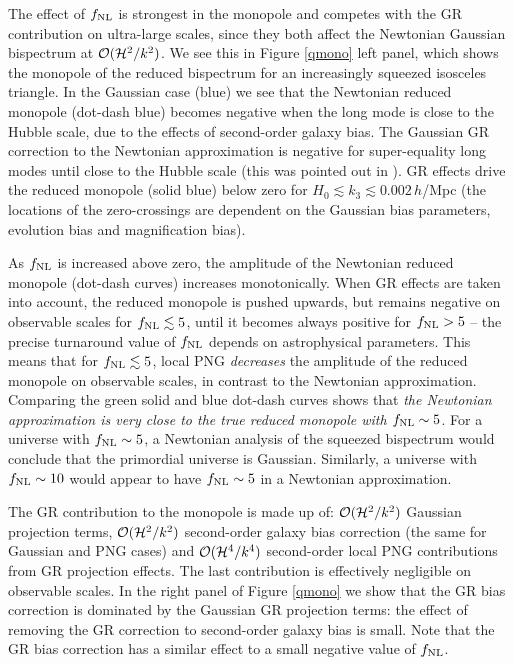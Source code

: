 {{{The effect of $f_\text{NL}$ is strongest in the monopole and competes with the GR contribution on ultra-large scales, since they both affect the Newtonian Gaussian bispectrum at ${\cal O}(\mathcal{H}^{2} / k^{2})$. We see this in Figure \ref{qmono} left panel, which shows the monopole of the reduced bispectrum for an increasingly squeezed isosceles triangle. 
In the Gaussian case (blue) we see that the Newtonian reduced monopole (dot-dash blue) becomes negative when the long mode is close to the Hubble scale, due to the effects of second-order galaxy bias.
The Gaussian GR correction to the Newtonian approximation is negative for super-equality long modes until close to the Hubble scale (this was pointed out in  \cite{Jolicoeur:2018blf}). GR effects drive the reduced monopole (solid blue) below zero for $H_0 \lesssim k_3\lesssim 0.002\,h$/Mpc  (the locations of the zero-crossings  are dependent on the Gaussian bias parameters, evolution bias and magnification bias). 

As $f_\text{NL}$ is increased above zero, the amplitude of the Newtonian reduced monopole (dot-dash curves) increases monotonically. When GR effects are taken into account, the reduced monopole is pushed upwards, but remains negative on observable scales for $f_\text{NL} \lesssim 5$, until it becomes always positive for $f_\text{NL}>5$   -- the precise turnaround value of $f_\text{NL}$ depends on astrophysical parameters. This means that for  $f_\text{NL} \lesssim 5$, 
local PNG {\em decreases} the amplitude of the reduced monopole on observable scales, in contrast to the Newtonian approximation. Comparing the green solid and blue dot-dash curves shows that {\em the Newtonian approximation is very close to the true reduced monopole with $f_\text{NL} \sim 5$}. For a universe with $f_\text{NL} \sim 5$, a Newtonian analysis of the squeezed bispectrum would conclude that the primordial universe is Gaussian. Similarly, a universe with $f_\text{NL} \sim 10$ would appear to have $f_\text{NL} \sim 5$ in a Newtonian approximation.

The GR contribution to the monopole is made up of: ${\cal O}(\mathcal{H}^{2} / k^{2})$ Gaussian projection terms, ${\cal O}(\mathcal{H}^{2} / k^{2})$  second-order galaxy bias correction (the same for Gaussian and PNG cases) and ${\cal O}(\mathcal{H}^{4} / k^{4})$ second-order local PNG contributions from GR projection effects.  The last contribution is effectively negligible on observable scales.
In the right panel of Figure \ref{qmono} we show that the GR bias correction is dominated by the Gaussian GR projection terms:  the effect of removing the GR correction to second-order galaxy bias is small. Note that the GR bias correction has a similar effect to a small negative value of $f_\text{NL}$.

}}}
